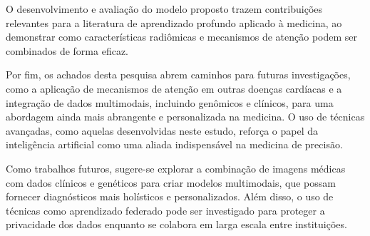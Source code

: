O desenvolvimento e avaliação do modelo proposto trazem contribuições relevantes para a literatura de aprendizado profundo aplicado à medicina, ao demonstrar como características radiômicas e mecanismos de atenção podem ser combinados de forma eficaz. 

Por fim, os achados desta pesquisa abrem caminhos para futuras investigações, como a aplicação de mecanismos de atenção em outras doenças cardíacas e a integração de dados multimodais, incluindo genômicos e clínicos, para uma abordagem ainda mais abrangente e personalizada na medicina. O uso de técnicas avançadas, como aquelas desenvolvidas neste estudo, reforça o papel da inteligência artificial como uma aliada indispensável na medicina de precisão.

Como trabalhos futuros, sugere-se explorar a combinação de imagens médicas com dados clínicos e genéticos para criar modelos multimodais, que possam fornecer diagnósticos mais holísticos e personalizados. Além disso, o uso de técnicas como aprendizado federado pode ser investigado para proteger a privacidade dos dados enquanto se colabora em larga escala entre instituições.


